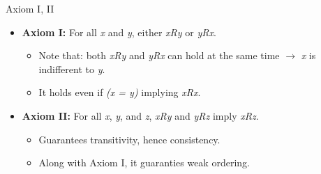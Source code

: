 \documentclass{beamer}
\begin{document}
\begin{frame}{Axiom I, II}

    \begin{itemize}
        \item \textbf{Axiom I:} For all \textit{x} and \textit{y}, either \textit{xRy} or \textit{yRx}.
        \begin{itemize}
            \item Note that: both \textit{xRy} and \textit{yRx} can hold at the same time $\rightarrow$ \textit{x} is indifferent to \textit{y}.
            \item It holds even if \textit{(x = y)} implying \textit{xRx}.
        \end{itemize}
        \vspace{0.5 cm}
        \item \textbf{Axiom II:} For all \textit{x}, \textit{y}, and \textit{z}, \textit{xRy} and \textit{yRz} imply \textit{xRz}.
        \begin{itemize}
            \item Guarantees transitivity, hence consistency.
            \item Along with Axiom I, it guaranties weak ordering.
        \end{itemize}
    \end{itemize}

    
\end{frame}
\end{document}
